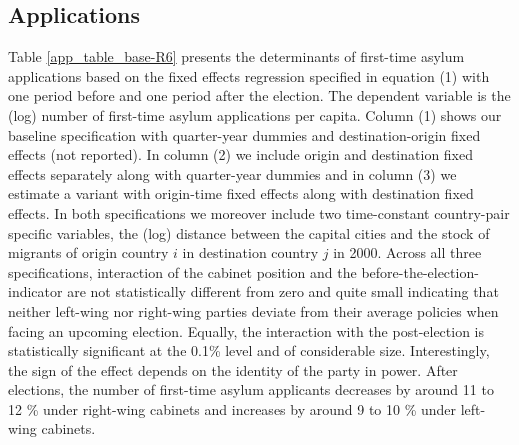 \documentclass[a4paper,12pt]{article}
\begin{document}
\subsection{Applications}

Table \ref{app_table_base-R6} presents the determinants of first-time asylum applications based on the fixed effects regression specified in equation (1) with one period before and one period after the election. The dependent variable is the (log) number of first-time asylum applications per capita. Column (1) shows our baseline specification with quarter-year dummies and destination-origin fixed effects (not reported). In column (2) we include origin and destination fixed effects separately along with quarter-year dummies and in column (3) we estimate a variant with origin-time fixed effects along with destination fixed effects. In both specifications we moreover include two time-constant country-pair specific variables, the (log) distance between the capital cities and the stock of migrants of origin country $i$ in destination country $j$ in 2000. Across all three specifications, interaction of the cabinet position and the before-the-election-indicator are not statistically different from zero and quite small indicating that neither left-wing nor right-wing parties deviate from their average policies when facing an upcoming election. Equally, the interaction with the post-election is statistically significant at the 0.1\% level and of considerable size. Interestingly, the sign of the effect depends on the identity of the party in power. After elections, the number of first-time asylum applicants decreases by around 11 to 12 \% under right-wing cabinets and increases by around 9 to 10 \% under left-wing cabinets. 
\end{document}

